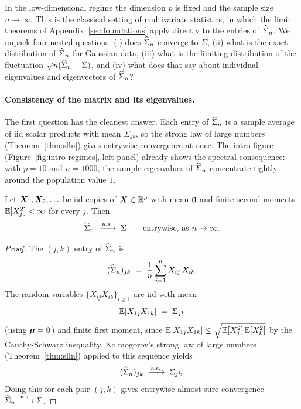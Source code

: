 In the low-dimensional regime the dimension \(p\) is fixed and the sample size \(n \to \infty\). This is the classical setting of multivariate statistics, in which the limit theorems of Appendix~\ref{sec:foundations} apply directly to the entries of \(\widehat{\Sigma}_n\). We unpack four nested questions: (i) does \(\widehat{\Sigma}_n\) converge to \(\Sigma\), (ii) what is the exact distribution of \(\widehat{\Sigma}_n\) for Gaussian data, (iii) what is the limiting distribution of the fluctuation \(\sqrt{n}(\widehat{\Sigma}_n - \Sigma)\), and (iv) what does that say about individual eigenvalues and eigenvectors of \(\widehat{\Sigma}_n\)?

\paragraph{Consistency of the matrix and its eigenvalues.} The first question has the cleanest answer. Each entry of \(\widehat{\Sigma}_n\) is a sample average of iid scalar products with mean \(\Sigma_{jk}\), so the strong law of large numbers (Theorem~\ref{thm:slln}) gives entrywise convergence at once. The intro figure (Figure~\ref{fig:intro-regimes}, left panel) already shows the spectral consequence: with \(p = 10\) and \(n = 1000\), the sample eigenvalues of \(\widehat{\Sigma}_n\) concentrate tightly around the population value \(1\).

\begin{theorem}\label{thm:scm-consistency}
Let \(\bm{X}_1, \bm{X}_2, \ldots\) be iid copies of \(\bm{X} \in \mathbb{R}^p\) with mean \(\bm{0}\) and finite second moments \(\mathbb{E}[X_j^2] < \infty\) for every \(j\). Then
\[
  \widehat{\Sigma}_n \;\xrightarrow{\,\text{a.s.}\,}\; \Sigma \qquad \text{entrywise, as } n \to \infty.
\]
\end{theorem}

\begin{proof}
The \((j, k)\) entry of \(\widehat{\Sigma}_n\) is
\[
  (\widehat{\Sigma}_n)_{jk} \;=\; \frac{1}{n} \sum_{i = 1}^n X_{ij}\, X_{ik}.
\]
The random variables \(\{X_{ij} X_{ik}\}_{i \ge 1}\) are iid with mean
\[
  \mathbb{E}[X_{1j} X_{1k}] \;=\; \Sigma_{jk}
\]
(using \(\bm{\mu} = \bm{0}\)) and finite first moment, since \(\mathbb{E}\lvert X_{1j} X_{1k}\rvert \le \sqrt{\mathbb{E}[X_j^2]\,\mathbb{E}[X_k^2]}\) by the Cauchy-Schwarz inequality. Kolmogorov's strong law of large numbers (Theorem~\ref{thm:slln}) applied to this sequence yields
\[
  (\widehat{\Sigma}_n)_{jk} \;\xrightarrow{\,\text{a.s.}\,}\; \Sigma_{jk}.
\]
Doing this for each pair \((j, k)\) gives entrywise almost-sure convergence \(\widehat{\Sigma}_n \xrightarrow{\,\text{a.s.}\,} \Sigma\).
\end{proof}

